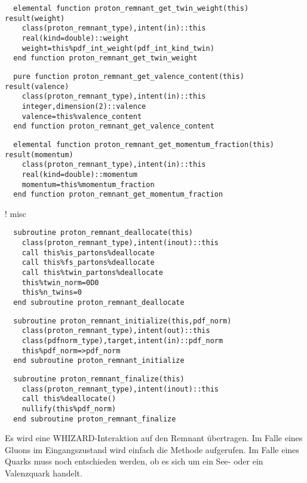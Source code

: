 \begin{Verbatim}
  elemental function proton_remnant_get_twin_weight(this) result(weight)
    class(proton_remnant_type),intent(in)::this
    real(kind=double)::weight
    weight=this%pdf_int_weight(pdf_int_kind_twin)
  end function proton_remnant_get_twin_weight
\end{Verbatim}

\begin{Verbatim}
  pure function proton_remnant_get_valence_content(this) result(valence)
    class(proton_remnant_type),intent(in)::this
    integer,dimension(2)::valence
    valence=this%valence_content
  end function proton_remnant_get_valence_content
\end{Verbatim}
  
\begin{Verbatim}
  elemental function proton_remnant_get_momentum_fraction(this) result(momentum)
    class(proton_remnant_type),intent(in)::this
    real(kind=double)::momentum
    momentum=this%momentum_fraction
  end function proton_remnant_get_momentum_fraction
\end{Verbatim}

  ! misc

\begin{Verbatim}
  subroutine proton_remnant_deallocate(this)
    class(proton_remnant_type),intent(inout)::this
    call this%is_partons%deallocate
    call this%fs_partons%deallocate
    call this%twin_partons%deallocate
    this%twin_norm=0D0
    this%n_twins=0
  end subroutine proton_remnant_deallocate
\end{Verbatim}

\begin{Verbatim}
  subroutine proton_remnant_initialize(this,pdf_norm)
    class(proton_remnant_type),intent(out)::this
    class(pdfnorm_type),target,intent(in)::pdf_norm
    this%pdf_norm=>pdf_norm
  end subroutine proton_remnant_initialize
\end{Verbatim}
  
\begin{Verbatim}
  subroutine proton_remnant_finalize(this)
    class(proton_remnant_type),intent(inout)::this
    call this%deallocate()
    nullify(this%pdf_norm)
  end subroutine proton_remnant_finalize
\end{Verbatim}
Es wird eine WHIZARD-Interaktion auf den Remnant übertragen. Im Falle eines Gluons im Eingangszustand wird einfach die Methode  aufgerufen. Im Falle eines Quarks muss noch entschieden werden, ob es sich um ein See- oder ein Valenzquark handelt.

